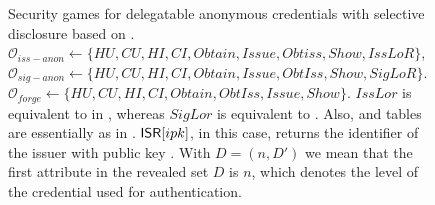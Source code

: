\begin{figure}[ht!]
  \centering
  \caption{Security games for delegatable anonymous credentials with selective
    disclosure based on \cite{fhs19}. $\mathcal{O}_{iss-anon} \gets \lbrace HU,
    CU,HI,CI,Obtain,Issue,Obtiss,Show,IssLoR\rbrace$, $\mathcal{O}_{sig-anon}
    \gets \lbrace HU,CU,HI,CI,Obtain,Issue,ObtIss,Show,SigLoR\rbrace$.
    $\mathcal{O}_{forge} \gets \lbrace HU,CU,HI,CI,Obtain,ObtIss,Issue,Show
    \rbrace$. $IssLor$ is equivalent to \OBTCHALb in \UAS, whereas $SigLor$ is
    equivalent to \CHALb. Also, \OWNR and \ATTR tables are essentially as in
    . $\mathsf{ISR}[ipk]$, in this case, returns the identifier
    of the issuer with public key \ipk. With $D =
    (n,D')$ we mean that the first attribute in the revealed set $D$ is $n$,
    which denotes the level of the credential used for authentication.}
  \label{fig:model-dac}  
\end{figure}

